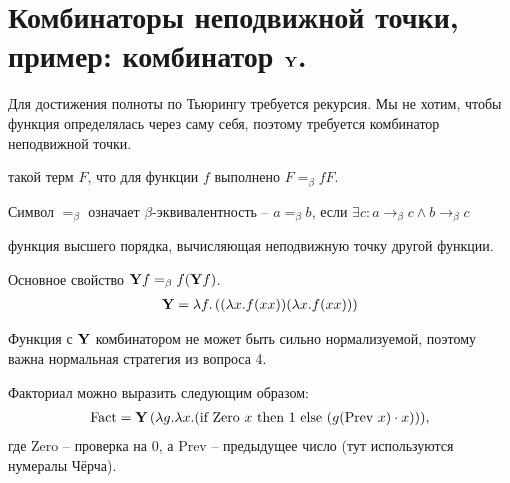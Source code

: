 \section{Комбинаторы неподвижной точки, пример: комбинатор \texorpdfstring{$\Y$}{}.}

Для достижения полноты по Тьюрингу требуется рекурсия.
Мы не хотим, чтобы функция определялась через саму себя, поэтому требуется комбинатор неподвижной точки.

\begin{definition}
такой терм $F$, что для функции $f$ выполнено $F =_\beta f F$.
\end{definition}

Символ $=_\beta$ означает $\beta$-эквивалентность – $a =_\beta b$, если $\exists c : a \to_\beta c \land b \to_\beta c$

\begin{definition}
функция высшего порядка, вычисляющая неподвижную точку другой функции.
\end{definition}

\begin{example}[$\Y$-комбинатор]
Основное свойство $\mathbf{Y} f =_\beta f(\mathbf{Y} f)$.
\begin{align}
    \mathbf{Y} = \lambda f.\left((\lambda x. f(xx)) (\lambda x. f(xx))\right)
\end{align}
\end{example}

\begin{important} 
Функция с $\Y$ комбинатором не может быть сильно нормализуемой, поэтому важна нормальная стратегия из вопроса 4.
\end{important}

\begin{example} 
Факториал можно выразить следующим образом:
\begin{align}
    \operatorname{Fact} = \mathbf{Y} \left( \lambda g . \lambda x . (
        \text{if Zero } x 
        \text{ then } 1 
        \text{ else } (g(\text{Prev } x) \cdot x)\right)
    ),
\end{align}
где Zero -- проверка на $0$, а Prev -- предыдущее число (тут используются нумералы Чёрча).
\end{example}
